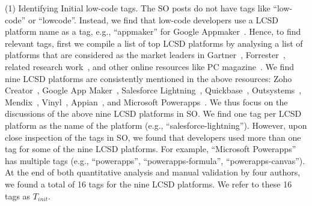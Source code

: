 (1) Identifying Initial low-code tags.
The SO posts do not have tags like ``low-code'' or ``lowcode''. Instead, we find that  low-code developers use a  LCSD platform name as a tag, e.g., ``appmaker'' for Google Appmaker~\cite{googleappmaker}. Hence, to find relevant tags, first we compile a list of top  LCSD platforms by analysing a list of platforms that are considered as the market leaders in Gartner~\cite{vincent2019magic}, Forrester~\cite{rymer2019forrester}, related research work~\cite{sahay2020supporting}, and other online resources like PC magazine~\cite{pcmag}. We find nine  LCSD platforms are consistently mentioned in the above resources: Zoho Creator~\cite{zohocreator}, Google App Maker~\cite{googleappmaker}, Salesforce Lightning~\cite{salesforce}, Quickbase~\cite{quickbase}, Outsystems~\cite{quickbase}, Mendix~\cite{mendix}, Vinyl~\cite{vinyl}, Appian~\cite{appian}, and Microsoft Powerapps~\cite{powerapps}. %
We thus focus on the discussions of the above nine LCSD platforms in SO. We find one tag per  LCSD platform as the name of the platform (e.g., ``salesforce-lightning''). 
However, upon close inspection of the tags in SO, we found that developers used more than one tag for some of the nine  LCSD platforms. For example, ``Microsoft Powerapps'' has multiple tags (e.g., ``powerapps'', ``powerapps-formula'', ``powerapps-canvas''). At the end of both quantitative analysis and manual validation by four authors, we found a total of 16 tags for the nine  LCSD platforms. We refer to these 16 tags as $T_{init}$. 



